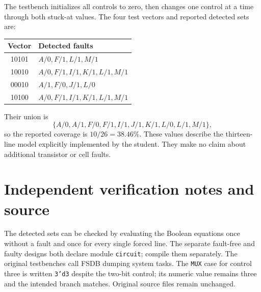 \documentclass[11pt,a4paper]{article}
\begin{document}
The testbench initializes all controls to zero, then changes one control at a time through both stuck-at values. The four test vectors and reported detected sets are:
\begin{center}\begin{tabular}{cl}\toprule
Vector&Detected faults\\\midrule
10101&$A/0,F/1,L/1,M/1$\\
10010&$A/0,F/1,I/1,K/1,L/1,M/1$\\
00010&$A/1,F/0,J/1,L/0$\\
10100&$A/0,F/1,I/1,K/1,L/1,M/1$\\\bottomrule
\end{tabular}\end{center}
Their union is
\[\{A/0,A/1,F/0,F/1,I/1,J/1,K/1,L/0,L/1,M/1\},\]
so the reported coverage is $10/26=38.46\%$. These values describe the thirteen-line model explicitly implemented by the student. They make no claim about additional transistor or cell faults.

\section{Independent verification notes and source}
The detected sets can be checked by evaluating the Boolean equations once without a fault and once for every single forced line. The separate fault-free and faulty designs both declare module \texttt{circuit}; compile them separately. The original testbenches call FSDB dumping system tasks. The \texttt{MUX} case for control three is written \texttt{3'd3} despite the two-bit control; its numeric value remains three and the intended branch matches. Original source files remain unchanged.
\end{document}
